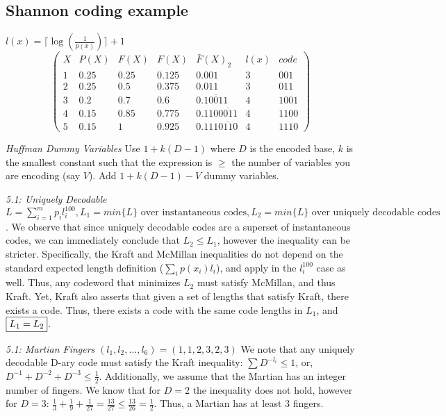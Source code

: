 \documentclass[10pt]{article}
\begin{document}
\begin{tiny}
\begin{multicols}{3}
\section*{Shannon coding example}
$l(x)= \lceil \log(\frac{1}{p(x)}) \rceil + 1$
\[
\begin{pmatrix}
      X & P(X) & F(X)  & F(X) & \bar{F}(X)_{2} & l(x) & code  \\
      1 & 0.25 & 0.25 & 0.125 & 0.001 & 3 & 001\\ 
      2 & 0.25 & 0.5 & 0.375 & 0.011 & 3 & 011\\ 
      3 & 0.2 & 0.7 & 0.6 & 0.\overline{10011} & 4 & 1001\\ 
      4 & 0.15 & 0.85 & 0.775 & 0.110 \overline{0011} & 4 & 1100\\ 
      5 & 0.15 & 1 & 0.925 & 0.111\overline{0110} & 4 & 1110
\end{pmatrix}
\]


\textit{Huffman Dummy Variables}
Use $1+k(D-1)$ where $D$ is the encoded base, $k$ is the smallest constant such that the expression is $\geq$ the number of variables you are encoding (say $V$). Add $1+k(D-1) - V$ dummy variables.

\textit{5.1: Uniquely Decodable}
$L = \sum_{i=1}^m p_i l_i^{100}, L_1 = min\{L\} \textrm { over instantaneous codes}, L_2 = min\{L\} \textrm{ over uniquely decodable codes}$. We observe that since uniquely decodable codes are a superset of instantaneous codes, we can immediately conclude that $L_2 \leq L_1$, however the inequality can be stricter. Specifically, the Kraft and McMillan inequalities do not depend on the standard expected length definition ($\sum_i p(x_i)l_i$), and apply in the $l_i^{100}$ case as well. Thus, any codeword that minimizes $L_2$ must satisfy McMillan, and thus Kraft. Yet, Kraft also asserts that given a set of lengths that satisfy Kraft, there exists a code. Thus, there exists a code with the same code lengths in $L_1$, and $\fbox{$L_1 = L_2$}$.

\textit{5.1: Martian Fingers}
$(l_1,l_2,...,l_6) = (1,1,2,3,2,3)$ We note that any uniquely decodable D-ary code must satisfy the Kraft inequality: $\sum D^{-l_i} \leq 1$, or, $D^{-1} + D^{-2} + D^{-3} \leq \frac{1}{2}$. Additionally, we assume that the Martian has an integer number of fingers. We know that for $D=2$ the inequality does not hold, however for $D=3$: $\frac{1}{3} + \frac{1}{9} + \frac{1}{27} = \frac{13}{27} \leq  \frac{13}{26} = \frac{1}{2}$. Thus, a Martian has at least $3$ fingers.


\end{multicols}
\end{tiny}
\end{document}
